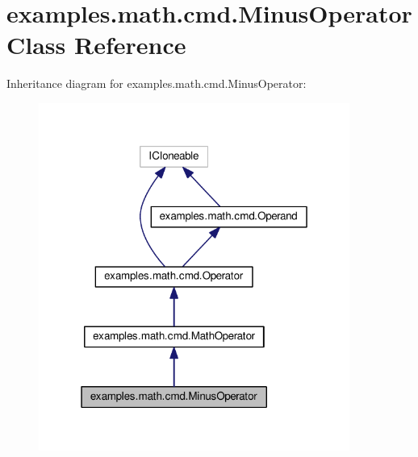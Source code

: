 \hypertarget{classexamples_1_1math_1_1cmd_1_1_minus_operator}{\section{examples.\-math.\-cmd.\-Minus\-Operator Class Reference}
\label{classexamples_1_1math_1_1cmd_1_1_minus_operator}
}


Inheritance diagram for examples.\-math.\-cmd.\-Minus\-Operator\-:
\nopagebreak
\begin{figure}[H]
\begin{center}
\leavevmode
\includegraphics[width=289pt]{classexamples_1_1math_1_1cmd_1_1_minus_operator__inherit__graph}
\end{center}
\end{figure}


